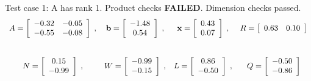 \newpage
\footnotesize{
Test case 1: A has rank 1. Product checks \textbf{FAILED}. Dimension checks passed.
\[
\begin{array}{*{4}{c}}
A = \left[\begin{array}{*{2}c}
	-0.32 & -0.05\\
	-0.55 & -0.08
\end{array}\right]
\;, & 
\mathbf{b} = \left[\begin{array}{*{1}c}
	-1.48\\
	0.54
\end{array}\right]
\;, & 
\mathbf{x} = \left[\begin{array}{*{1}c}
	0.43\\
	0.07
\end{array}\right]
\;, & 
R = \left[\begin{array}{*{2}c}
	0.63 & 0.10
\end{array}\right]
\\
\\\mbox{}\\
N = \left[\begin{array}{*{1}c}
	0.15\\
	-0.99
\end{array}\right]
\;, & 
W = \left[\begin{array}{*{1}c}
	-0.99\\
	-0.15
\end{array}\right]
\;, & 
L = \left[\begin{array}{*{1}c}
	0.86\\
	-0.50
\end{array}\right]
\;, & 
Q = \left[\begin{array}{*{1}c}
	-0.50\\
	-0.86
\end{array}\right]
\\
\end{array}
\]
\hrulefill

}

